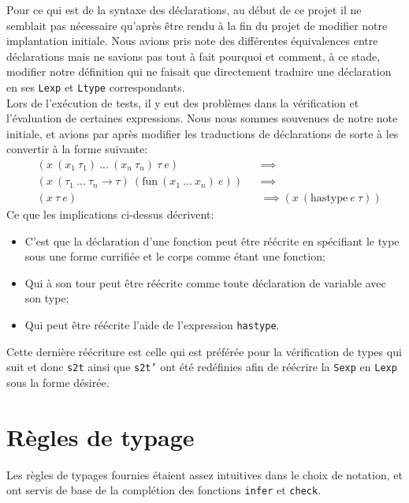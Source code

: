 \documentclass[11pt, titlepage]{article}
\begin{document}
Pour ce qui est de la syntaxe des déclarations, au début de ce projet il ne
semblait pas nécessaire qu'après être rendu à la fin du projet de modifier
notre implantation initiale. Nous avions pris note des différentes équivalences
entre déclarations mais ne savions pas tout à fait pourquoi et comment, à ce
stade, modifier notre définition qui ne faisait que directement traduire une
déclaration en ses \texttt{Lexp} et \texttt{Ltype} correspondants. \\
Lors de l'exécution de tests, il y eut des problèmes dans la vérification et
l'évaluation de certaines expressions. Nous nous sommes souvenues de notre note
initiale, et avions par après modifier les traductions de déclarations de sorte
à les convertir à la forme suivante:
\begin{equation*}
    \begin{aligned}
        & (x \ (x_1 \ \tau_1) \ ... \ (x_n \ \tau_n) \ \tau \ e) && \implies \\
        & (x \ (\tau_1 \ ... \ \tau_n \rightarrow \tau) \ (\text{fun} \
            (x_1 \ ... \ x_n) \ e)) && \implies \\
        & (x \ \tau \ e) && \implies (x \ (\text{hastype} \ e \ \tau))
    \end{aligned}
\end{equation*}
Ce que les implications ci-dessus décrivent:
\begin{itemize}
    \item C'est que la déclaration d'une fonction peut être réécrite en
    spécifiant le type sous une forme currifiée et le corps comme étant une
    fonction;
    \item Qui à son tour peut être réécrite comme toute déclaration de variable
    avec son type;
    \item Qui peut être réécrite l'aide de l'expression \texttt{hastype}.
\end{itemize}
Cette dernière réécriture est celle qui est préférée pour la vérification de
types qui suit et donc \texttt{s2t} ainsi que \texttt{s2t'} ont été redéfinies
afin de réécrire la \texttt{Sexp} en \texttt{Lexp} sous la forme désirée.

\section{Règles de typage}

Les règles de typages fournies étaient assez intuitives dans le choix de
notation, et ont servis de base de la complétion des fonctions \texttt{infer}
et \texttt{check}.
\end{document}
